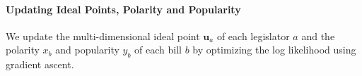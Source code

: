 \paragraph{Updating Ideal Points, Polarity and Popularity}
\label{subsec:c6_upadte_ideal_point}

We update the multi-dimensional ideal point $\bm u_a$ of each legislator $a$ and
the polarity $x_b$ and popularity $y_b$ of each bill $b$ by optimizing the log
likelihood using gradient ascent.















